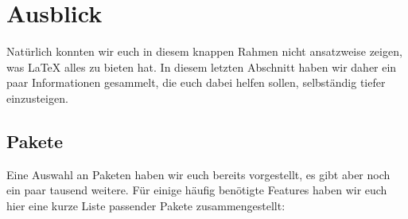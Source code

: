 \chapter{Ausblick}
\label{sec:prospects}

Natürlich konnten wir euch in diesem knappen Rahmen nicht ansatzweise zeigen, was \LaTeX{} alles zu bieten hat.
In diesem letzten Abschnitt haben wir daher ein paar Informationen gesammelt, die euch dabei helfen sollen, selbständig tiefer einzusteigen.

\section{Pakete}

Eine Auswahl an Paketen haben wir euch bereits vorgestellt, es gibt aber noch ein paar tausend weitere.
Für einige häufig benötigte Features haben wir euch hier eine kurze Liste passender Pakete zusammengestellt:

